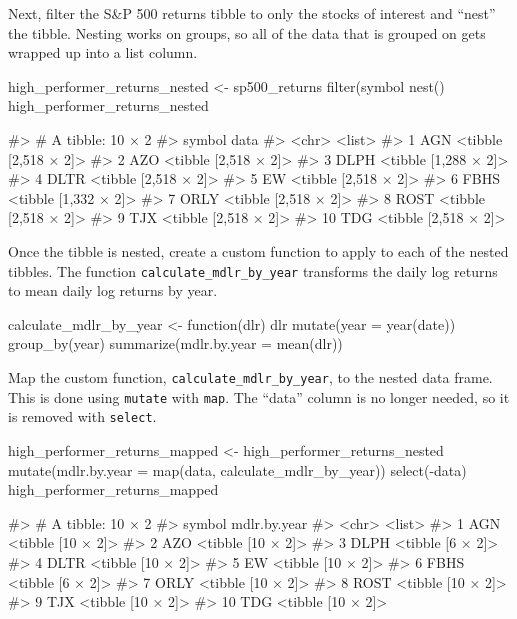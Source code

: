 \hspace{20 mm}

Next, filter the S\&P 500 returns tibble to only the stocks of interest
and ``nest'' the tibble. Nesting works on groups, so all of the data
that is grouped on gets wrapped up into a list column.

\begin{Schunk}
\begin{Sinput}
high_performer_returns_nested <- sp500_returns %
    filter(symbol %
    nest()
high_performer_returns_nested
\end{Sinput}
\begin{Soutput}
#> # A tibble: 10 × 2
#>    symbol                 data
#>     <chr>               <list>
#> 1     AGN <tibble [2,518 × 2]>
#> 2     AZO <tibble [2,518 × 2]>
#> 3    DLPH <tibble [1,288 × 2]>
#> 4    DLTR <tibble [2,518 × 2]>
#> 5      EW <tibble [2,518 × 2]>
#> 6    FBHS <tibble [1,332 × 2]>
#> 7    ORLY <tibble [2,518 × 2]>
#> 8    ROST <tibble [2,518 × 2]>
#> 9     TJX <tibble [2,518 × 2]>
#> 10    TDG <tibble [2,518 × 2]>
\end{Soutput}
\end{Schunk}

\hspace{20 mm}

Once the tibble is nested, create a custom function to apply to each of
the nested tibbles. The function \texttt{calculate\_mdlr\_by\_year}
transforms the daily log returns to mean daily log returns by year.

\begin{Schunk}
\begin{Sinput}
calculate_mdlr_by_year <- function(dlr) {
    dlr %
        mutate(year = year(date)) %
        group_by(year) %
        summarize(mdlr.by.year = mean(dlr))
}
\end{Sinput}
\end{Schunk}

Map the custom function, \texttt{calculate\_mdlr\_by\_year}, to the
nested data frame. This is done using \texttt{mutate} with \texttt{map}.
The ``data'' column is no longer needed, so it is removed with
\texttt{select}.

\pagebreak

\begin{Schunk}
\begin{Sinput}
high_performer_returns_mapped <- high_performer_returns_nested %
    mutate(mdlr.by.year = map(data, calculate_mdlr_by_year)) %
    select(-data)
high_performer_returns_mapped
\end{Sinput}
\begin{Soutput}
#> # A tibble: 10 × 2
#>    symbol      mdlr.by.year
#>     <chr>            <list>
#> 1     AGN <tibble [10 × 2]>
#> 2     AZO <tibble [10 × 2]>
#> 3    DLPH  <tibble [6 × 2]>
#> 4    DLTR <tibble [10 × 2]>
#> 5      EW <tibble [10 × 2]>
#> 6    FBHS  <tibble [6 × 2]>
#> 7    ORLY <tibble [10 × 2]>
#> 8    ROST <tibble [10 × 2]>
#> 9     TJX <tibble [10 × 2]>
#> 10    TDG <tibble [10 × 2]>
\end{Soutput}
\end{Schunk}

